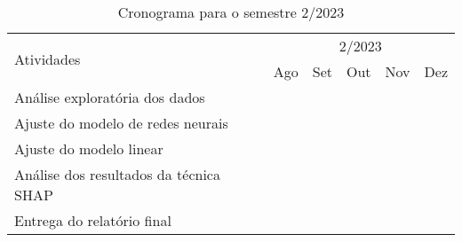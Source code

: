 		\begin{table}[H]
		\centering
		\footnotesize
		\caption{Cronograma para o semestre 2/2023}
			\begin{tabular}{|l|c|c|c|c|c|} \hline
				\multirow{2}{*}{Atividades} & \multicolumn{5}{c|}{2/2023} \\ \cline{2-6}				
				  & Ago & Set & Out & Nov & Dez \\ \hline	
			     
			    Análise exploratória dos dados    & \cellcolor{midgray} & \cellcolor{midgray}& & & \\ \hline
       
				Ajuste do modelo de redes neurais      &  & \cellcolor{midgray} & \cellcolor{midgray} & \cellcolor{midgray}&\\ \hline        
    
				Ajuste do modelo linear     & &\cellcolor{midgray} & \cellcolor{midgray} & \cellcolor{midgray} &  \\ \hline     
    
				Análise dos resultados da técnica SHAP    & & & \cellcolor{midgray}  & \cellcolor{midgray}&  \\ \hline     
    
				Entrega do relatório final  & & & &   & \cellcolor{midgray} \\ \hline
				
				
        	\end{tabular}
		\end{table}

